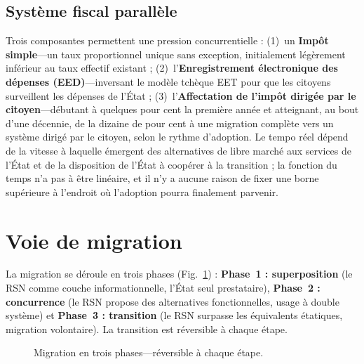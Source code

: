\documentclass[11pt,a4paper,twocolumn]{article}
\begin{document}
\subsection{Système fiscal parallèle}

Trois composantes permettent une pression concurrentielle : (1)~un \textbf{Impôt simple}---un taux proportionnel unique sans exception, initialement légèrement inférieur au taux effectif existant ; (2)~l'\textbf{Enregistrement électronique des dépenses (EED)}---inversant le modèle tchèque EET pour que les citoyens surveillent les dépenses de l'État ; (3)~l'\textbf{Affectation de l'impôt dirigée par le citoyen}---débutant à quelques pour cent la première année et atteignant, au bout d'une décennie, de la dizaine de pour cent à une migration complète vers un système dirigé par le citoyen, selon le rythme d'adoption. Le tempo réel dépend de la vitesse à laquelle émergent des alternatives de libre marché aux services de l'État et de la disposition de l'État à coopérer à la transition ; la fonction du temps n'a pas à être linéaire, et il n'y a aucune raison de fixer une borne supérieure à l'endroit où l'adoption pourra finalement parvenir.

\section{Voie de migration}

La migration se déroule en trois phases (Fig.~\ref{fig:migration}) : \textbf{Phase~1 : superposition} (le RSN comme couche informationnelle, l'État seul prestataire), \textbf{Phase~2 : concurrence} (le RSN propose des alternatives fonctionnelles, usage à double système) et \textbf{Phase~3 : transition} (le RSN surpasse les équivalents étatiques, migration volontaire). La transition est réversible à chaque étape.

\begin{figure}[ht]
\centering
{}
\caption{Migration en trois phases---réversible à chaque étape.}
\label{fig:migration}
\end{figure}
\end{document}
